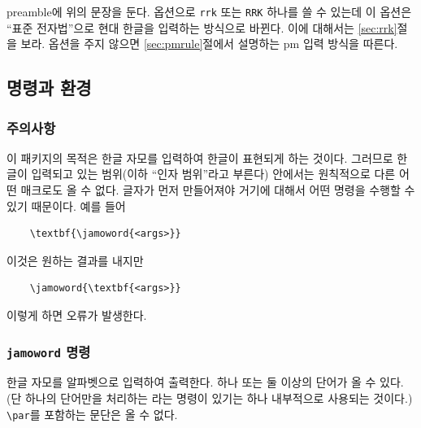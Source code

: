 \documentclass[a4paper]{oblivoir}
\let\cmda\cmd
\begin{document}
\begin{boxedverbatim}
\usepackage[<option>]{pmhanguljamo}
\end{boxedverbatim}

preamble에 위의 문장을 둔다. 옵션으로 \verb|rrk| 또는 \verb|RRK| 하나를 쓸 수 있는데
이 옵션은 ``표준 전자법''으로 현대 한글을 입력하는 방식으로 바뀐다. 이에 대해서는 
\ref{sec:rrk}절을 보라.
옵션을 주지 않으면 \ref{sec:pmrule}절에서 설명하는 pm 입력 방식을 따른다.

\subsection{명령과 환경}

\subsubsection{주의사항}

이 패키지의 목적은 한글 자모를 입력하여 한글이 표현되게 하는 것이다.
그러므로 한글이 입력되고 있는 범위(이하 “인자 범위”라고 부른다) 안에서는
원칙적으로 다른 어떤 매크로도 올 수 없다. 글자가 먼저 만들어져야 거기에 대해서
어떤 명령을 수행할 수 있기 때문이다. 예를 들어
\begin{verbatim}
    \textbf{\jamoword{<args>}}
\end{verbatim}
이것은 원하는 결과를 내지만
\begin{verbatim}
    \jamoword{\textbf{<args>}}
\end{verbatim}
이렇게 하면 오류가 발생한다.

\subsubsection{\texttt{\bs jamoword} 명령}

\begin{boxedverbatim}
\end{boxedverbatim}

한글 자모를 알파벳으로 입력하여 출력한다. 
하나 또는 둘 이상의 단어가 올 수 있다. (단 하나의 단어만을 처리하는 \cmda{\jamotextcmd}라는 명령이
있기는 하나 내부적으로 사용되는 것이다.) 
\verb|\par|를 포함하는 문단은 올 수 없다.

\medskip

\begin{exampleside}
\end{exampleside}
\end{document}
